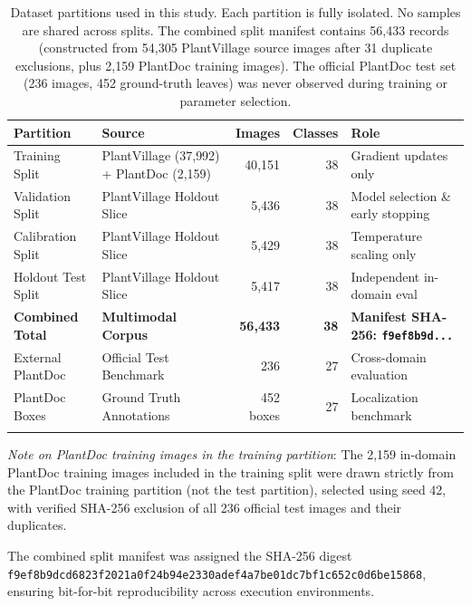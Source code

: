 \documentclass[pdflatex,sn-mathphys-num]{sn-jnl}
\theoremstyle{thmstyleone}%
\theoremstyle{thmstyletwo}%
\theoremstyle{thmstylethree}%
\begin{document}
\begin{table}[h]
\caption{Dataset partitions used in this study. Each partition is fully isolated. No
samples are shared across splits. The combined split manifest contains 56,433 records
(constructed from 54,305 PlantVillage source images after 31 duplicate exclusions,
plus 2,159 PlantDoc training images). The official PlantDoc test set (236 images, 452
ground-truth leaves) was never observed during training or parameter selection.}\label{tab:dataset_partitions}%
\setlength{\tabcolsep}{3pt}%
\begin{tabular*}{\textwidth}{@{\extracolsep\fill}lp{4.2cm}rrl}
\toprule
\textbf{Partition} & \textbf{Source} & \textbf{Images} & \textbf{Classes} & \textbf{Role} \\
\midrule
Training Split & \raggedright PlantVillage (37{,}992) + PlantDoc (2{,}159) & 40{,}151 & 38 & Gradient updates only \\
Validation Split & \raggedright PlantVillage Holdout Slice & 5{,}436 & 38 & Model selection \& early stopping \\
Calibration Split & \raggedright PlantVillage Holdout Slice & 5{,}429 & 38 & Temperature scaling only \\
Holdout Test Split & \raggedright PlantVillage Holdout Slice & 5{,}417 & 38 & Independent in-domain eval \\
\midrule
\textbf{Combined Total} & \textbf{Multimodal Corpus} & \textbf{56{,}433} & \textbf{38} & \textbf{Manifest SHA-256: \texttt{f9ef8b9d...}} \\
\midrule
External PlantDoc & \raggedright Official Test Benchmark & 236 & 27 & Cross-domain evaluation \\
PlantDoc Boxes & \raggedright Ground Truth Annotations & 452 boxes & 27 & Localization benchmark \\
\botrule
\end{tabular*}
\end{table}

\noindent\textit{Note on PlantDoc training images in the training partition}: The 2{,}159
in-domain PlantDoc training images included in the training split were drawn strictly
from the PlantDoc training partition (not the test partition), selected using seed 42,
with verified SHA-256 exclusion of all 236 official test images and their duplicates.

The combined split manifest was assigned the SHA-256 digest
\texttt{f9ef8b9dcd6823f2021a0f24b94e2330adef4a7be01dc7bf1c652c0d6be15868}, ensuring
bit-for-bit reproducibility across execution environments.
\end{document}
